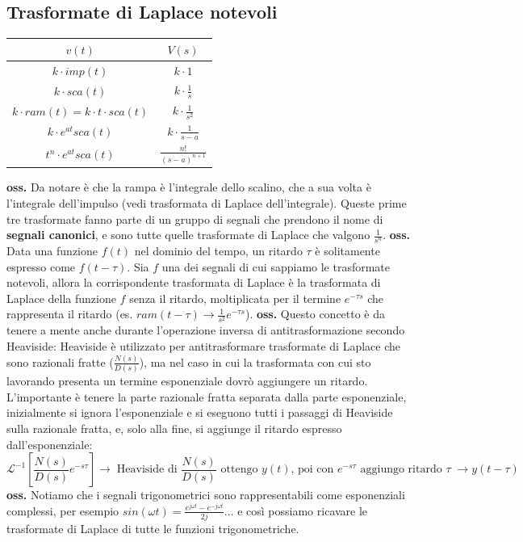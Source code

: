 \subsection{Trasformate di Laplace notevoli}
\renewcommand{\arraystretch}{2}
\begin{center}
    \begin{tabular}{ |c|c| } 
     \hline
     \;\;\;\;\;\;\;\;\;\;\;\;\;\;\;$v(t)$ \;\;\;\;\;\;\;\;\;\;\;\;\;\;\;& \;\;\;\;\;\;\;\;\;\;\;\;\;\;\;$V(s)$ \;\;\;\;\;\;\;\;\;\;\;\;\;\;\;\\ 
     \hline
     $k \cdot imp(t)$ & $k \cdot 1$ \\ 
     $k \cdot sca(t)$ & $k \cdot \frac{1}{s}$  \\ 
     $k \cdot ram(t) =k \cdot t \cdot  sca(t)$ & $k \cdot \frac{1}{s^2}$ \\
     $k \cdot e^{at}sca(t)$ & $k \cdot \frac{1}{s-a}$ \\ 
     $t^{n}\cdot e^{at}sca(t)$ & $\frac{n!}{(s-a)^{n+1}}$\\ 
     \hline
    \end{tabular}
\end{center}
\renewcommand{\arraystretch}{1}
\textbf{oss.} Da notare è che la rampa è l'integrale dello scalino, che a sua volta è l'integrale dell'impulso (vedi trasformata di Laplace dell'integrale). Queste prime tre trasformate fanno parte di un gruppo di segnali che prendono il nome di \textbf{segnali canonici}, e sono tutte quelle trasformate di Laplace che valgono $\frac{1}{s^n}$.\newline
\newline
\textbf{oss.} Data una funzione $f(t)$ nel dominio del tempo, un ritardo $\tau$ è solitamente espresso come $f(t-\tau)$. Sia $f$ una dei segnali di cui sappiamo le trasformate notevoli, allora la corrispondente trasformata di Laplace è la trasformata di Laplace della funzione $f$ senza il ritardo, moltiplicata per il termine $e^{- \tau s}$ che rappresenta il ritardo (es. $ram(t-\tau) \rightarrow \frac{1}{s^2}e^{- \tau s}$).\newline
\newline
\textbf{oss.}  Questo concetto è da tenere a mente anche durante l'operazione inversa di antitrasformazione secondo Heaviside: Heaviside è utilizzato per antitrasformare trasformate di Laplace che sono razionali fratte ($\frac{N(s)}{D(s)}$), ma nel caso in cui la trasformata con cui sto lavorando presenta un termine esponenziale dovrò aggiungere un ritardo. L'importante è tenere la parte razionale fratta separata dalla parte esponenziale, inizialmente si ignora l'esponenziale e si eseguono tutti i passaggi di Heaviside sulla razionale fratta, e, solo alla fine, si aggiunge il ritardo espresso dall'esponenziale:
\[
    \mathcal{L}^{-1}[\frac{N(s)}{D(s)}e^{-s \tau}] \rightarrow \;\text{Heaviside di $\frac{N(s)}{D(s)}$ ottengo $y(t)$, poi con $e^{-s \tau}$ aggiungo ritardo $\tau$}\; \rightarrow  y(t- \tau)
\]
\newline
\textbf{oss.}  Notiamo che i segnali trigonometrici sono rappresentabili come esponenziali complessi, per esempio $sin(\omega t) = \frac{e^{j \omega t}- e^{-j \omega t}}{2j} \dots$ e così possiamo ricavare le trasformate di Laplace di tutte le funzioni trigonometriche.
